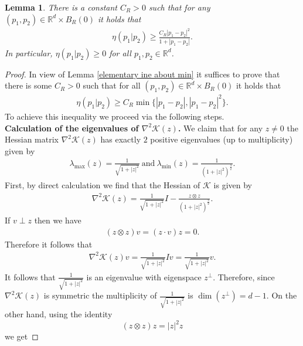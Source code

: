 \documentclass[10pt,a4paper]{amsart}
\newtheorem{lem}{Lemma}
\begin{document}
\begin{lem}\label{coercivity positivity of eta}
There is a constant $C_{R}>0$ such that for any $(p_{1},p_{2})\in \mathbb{R}^{d}\times B_{R}(0)$ it holds that 
 \begin{align*}
 \eta(p_{1}\vert p_{2})\geq \frac{C_{R}\left\vert p_{1}-p_{2}\right\vert^{2}}{1+\left\vert p_{1}-p_{2}\right\vert}.     
 \end{align*}
In particular, $\eta(p_{1}\vert p_{2})\geq 0$ for all $p_{1},p_{2}\in \mathbb{R}^{d}$. 
\end{lem}

\begin{proof}
In view of Lemma \ref{elementary ine about min} it suffices to prove that there is some $C_{R}>0$ such that for all $(p_{1},p_{2})\in \mathbb{R}^{d}\times B_{R}(0)$ it holds that 
\begin{align}
\eta(p_{1}\vert p_{2})\geq C_{R}\min\{\left\vert p_{1}-p_{2}\right\vert ,\left\vert p_{1}-p_{2}\right\vert^{2} \}. \label{eta requested inequality}   \end{align}
To achieve this inequality we proceed via the following steps. \\
\textbf{Calculation of the eigenvalues of $\nabla^{2}\mathscr{K}(z)$.} We claim that for any $z\neq 0$ the Hessian matrix $\nabla^{2}\mathscr{K}(z)$ has exactly $2$ positive eigenvalues (up to multiplicity) given by 
\begin{align}
\lambda_{\max}(z)=\frac{1}{\sqrt{1+\left\vert z\right\vert^{2}}} \ \mbox{and}\ \lambda_{\min}(z)=\frac{1}{(1+\left\vert z\right\vert^{2})^{\frac{3}{2}}}. \label{formula for eigenvalues}    
\end{align}
First, by direct calculation we find that the Hessian of $\mathscr{K}$ is given by 
\begin{align*}
\nabla^{2}\mathscr{K}(z)=\frac{1}{\sqrt{1+\left\vert z\right\vert^{2} }}I-\frac{z\otimes z}{(1+\left\vert z\right\vert^{2})^{\frac{3}{2}}}.     
\end{align*}
If $v\perp z$ then we have 
\begin{align*}
(z\otimes z)v=(z\cdot v)z=0.   
\end{align*}
Therefore it follows that 
\begin{align*}
\nabla^{2}\mathscr{K}(z)v=\frac{1}{\sqrt{1+\left\vert z\right\vert^{2}}}Iv=\frac{1}{\sqrt{1+\left\vert z\right\vert^{2}}}v.
\end{align*}
It follows that $\frac{1}{\sqrt{1+\left\vert z\right\vert^{2}}}$ is an eigenvalue with eigenspace $z^{\perp}$. Therefore, since $\nabla^{2}\mathscr{K}(z)$ is symmetric the multiplicity of $\frac{1}{\sqrt{1+\left\vert z\right\vert^{2}}}$ is $\dim(z^{\perp})=d-1$. On the other hand, using the identity $$(z\otimes z)z=\left\vert z\right\vert^{2}z$$ we get  

\end{proof}
\end{document}
